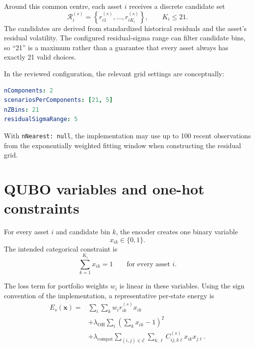\documentclass[11pt,a4paper]{article}
\begin{document}
Around this common centre, each asset $i$ receives a discrete candidate set
\begin{equation}
  \mathcal{R}^{(s)}_i
  = \left\{r^{(s)}_{i1},\ldots,r^{(s)}_{iK_i}\right\},
  \qquad K_i \leq 21.
\end{equation}
The candidates are derived from standardized historical residuals and the
asset's residual volatility. The configured residual-sigma range can filter
candidate bins, so ``21'' is a maximum rather than a guarantee that every asset
always has exactly 21 valid choices.

In the reviewed configuration, the relevant grid settings are conceptually:

\begin{lstlisting}[language=yaml]
nComponents: 2
scenariosPerComponents: [21, 5]
nZBins: 21
residualSigmaRange: 5
\end{lstlisting}

With \texttt{nNearest: null}, the implementation may use up to 100 recent
observations from the exponentially weighted fitting window when constructing
the residual grid.

\section{QUBO variables and one-hot constraints}

For every asset $i$ and candidate bin $k$, the encoder creates one binary
variable
\begin{equation}
  x_{ik}\in\{0,1\}.
\end{equation}
The intended categorical constraint is
\begin{equation}
  \sum_{k=1}^{K_i}x_{ik}=1
  \qquad\text{for every asset }i.
\end{equation}

The loss term for portfolio weights $w_i$ is linear in these variables. Using
the sign convention of the implementation, a representative per-state energy is
\begin{equation}
\begin{split}
 E_s(\mathbf{x}) ={}&
   \sum_i\sum_k w_i r^{(s)}_{ik}x_{ik} \\
 &+\lambda_{\mathrm{OH}}
   \sum_i\left(\sum_k x_{ik}-1\right)^2 \\
 &+\lambda_{\mathrm{compat}}
   \sum_{(i,j)\in\mathcal{E}}\sum_{k,\ell}
   C^{(s)}_{ij,k\ell}x_{ik}x_{j\ell}.
\end{split}
\end{equation}
\end{document}
